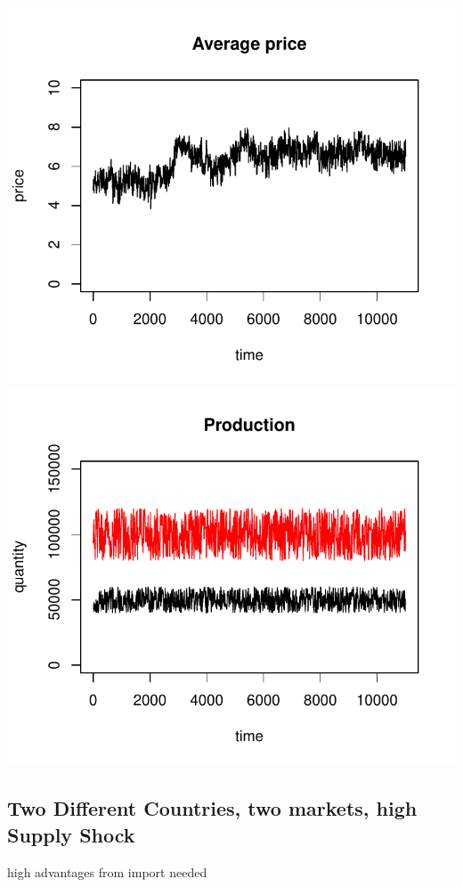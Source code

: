 \documentclass{article}
\begin{document}
\noindent
\vskip-5mm
\hskip-1cm
\includegraphics[scale=0.5]{fig_case05_price}
\includegraphics[scale=0.5]{fig_case05_production}

\newpage

\subsection{Two Different Countries, two markets, high Supply Shock}
high advantages from import needed
\end{document}

